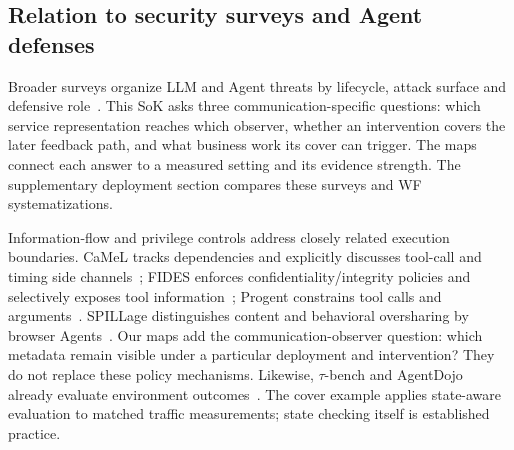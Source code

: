 \subsection{Relation to security surveys and Agent defenses}
Broader surveys organize LLM and Agent threats by lifecycle, attack surface and defensive role~\cite{yao2024survey,shahriar2025survey,ferrag2025survey}. This SoK asks three communication-specific questions: which service representation reaches which observer, whether an intervention covers the later feedback path, and what business work its cover can trigger. The maps connect each answer to a measured setting and its evidence strength. The supplementary deployment section compares these surveys and WF systematizations.

Information-flow and privilege controls address closely related execution boundaries. CaMeL tracks dependencies and explicitly discusses tool-call and timing side channels~\cite{debenedetti2025camel}; FIDES enforces confidentiality/integrity policies and selectively exposes tool information~\cite{costa2025fides}; Progent constrains tool calls and arguments~\cite{shi2025progent}. SPILLage distinguishes content and behavioral oversharing by browser Agents~\cite{roh2026spillage}. Our maps add the communication-observer question: which metadata remain visible under a particular deployment and intervention? They do not replace these policy mechanisms. Likewise, $\tau$-bench and AgentDojo already evaluate environment outcomes~\cite{yao2024taubench,debenedetti2024agentdojo}. The cover example applies state-aware evaluation to matched traffic measurements; state checking itself is established practice.
